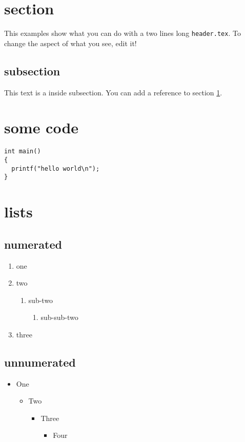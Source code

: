 \documentclass[11pt]{article}
\author{root}
\date{\today}
\title{}
\begin{document}
\tableofcontents

\section{section}
\label{sec:org1b0318a}
This examples show what you can do with a two lines long \texttt{header.tex}.
To change the aspect of what you see, edit it!
\subsection{subsection}
\label{sec:orgbb23819}
This text is a inside subsection. You can add a reference to section \ref{sec:org1b0318a}.

\section{some code}
\label{sec:org5c7a7c0}
\begin{verbatim}
int main()
{
  printf("hello world\n");
}
\end{verbatim}
\section{lists}
\label{sec:orgce97164}
\subsection{numerated}
\label{sec:org7e1eff3}
\begin{enumerate}
\item one
\item two
\begin{enumerate}
\item sub-two
\begin{enumerate}
\item sub-sub-two
\end{enumerate}
\end{enumerate}
\item three
\end{enumerate}

\subsection{unnumerated}
\label{sec:orga8a7ec4}
\begin{itemize}
\item One
\begin{itemize}
\item Two
\begin{itemize}
\item Three
\begin{itemize}
\item Four
\end{itemize}
\end{itemize}
\end{itemize}
\end{itemize}
\end{document}
